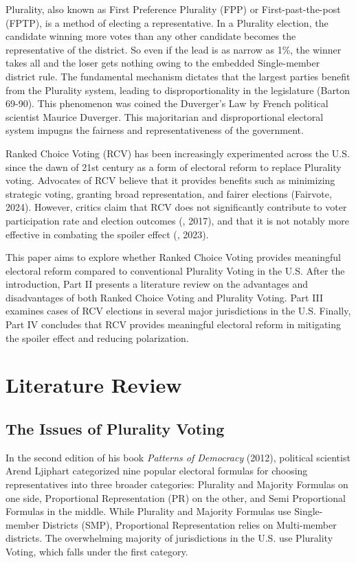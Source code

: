 \documentclass[12pt, a4paper, twoside]{article}
\begin{document}
Plurality, also known as First Preference Plurality (FPP) or First-past-the-post (FPTP), is a method of electing a representative. In a Plurality election, the candidate winning more votes than any other candidate becomes the representative of the district. So even if the lead is as narrow as 1\%, the winner takes all and the loser gets nothing owing to the embedded Single-member district rule. The fundamental mechanism dictates that the largest parties benefit from the Plurality system, leading to disproportionality in the legislature (Barton 69-90). This phenomenon was coined the Duverger’s Law by French political scientist Maurice Duverger. This majoritarian and disproportional electoral system impugns the fairness and representativeness of the government.

Ranked Choice Voting (RCV) has been increasingly experimented across the U.S. since the dawn of 21st century as a form of electoral reform to replace Plurality voting. Advocates of RCV believe that it provides benefits such as minimizing strategic voting, granting broad representation, and fairer elections (Fairvote, 2024). However, critics claim that RCV does not significantly contribute to voter participation rate and election outcomes (\cite{nielson2017}, 2017), and that it is not notably more effective in combating the spoiler effect (\cite{bristowjohnson2023}, 2023).

This paper aims to explore whether Ranked Choice Voting provides meaningful electoral reform compared to conventional Plurality Voting in the U.S. After the introduction, Part II presents a literature review on the advantages and disadvantages of both Ranked Choice Voting and Plurality Voting. Part III examines cases of RCV elections in several major jurisdictions in the U.S. Finally, Part IV concludes that RCV provides meaningful electoral reform in mitigating the spoiler effect and reducing polarization. 

\section{Literature Review}

\subsection{The Issues of Plurality Voting}

In the second edition of his book \emph{Patterns of Democracy} (2012), political scientist Arend Ljiphart categorized nine popular electoral formulas for choosing representatives into three broader categories: Plurality and Majority Formulas on one side, Proportional Representation (PR) on the other, and Semi Proportional Formulas in the middle. While Plurality and Majority Formulas use Single-member Districts (SMP), Proportional Representation relies on Multi-member districts. The overwhelming majority of jurisdictions in the U.S. use Plurality Voting, which falls under the first category. 
\end{document}
